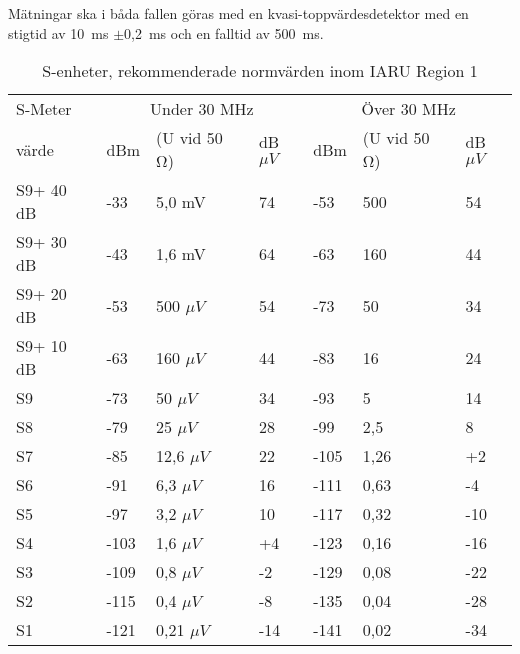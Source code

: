 Mätningar ska i båda fallen göras med en kvasi-toppvärdesdetektor
med en stigtid av 10~ms \(\pm\)0,2~ms och en falltid av 500~ms.

\begin{table}[h]
  \begin{tabular}{l|lll|lll}
    S-Meter  & \multicolumn{3}{c}{Under 30 MHz} & \multicolumn{3}{c}{Över 30 MHz} \\
    värde    & dBm & (U vid 50 Ω) & dB\(\mu V\) & dBm & (U vid 50 Ω) & dB\(\mu V\) \\
    \hline
    S9+ 40 dB & -33  & 5,0 mV  & 74  & -53  & 500  & 54  \\
    S9+ 30 dB & -43  & 1,6 mV  & 64  & -63  & 160  & 44  \\
    S9+ 20 dB & -53  & 500 \(\mu V\)  & 54  & -73  & 50   & 34  \\
    S9+ 10 dB & -63  & 160 \(\mu V\)  & 44  & -83  & 16   & 24  \\
    S9        & -73  & 50 \(\mu V\)   & 34  & -93  & 5    & 14  \\
    S8        & -79  & 25 \(\mu V\)   & 28  & -99  & 2,5  & 8   \\
    S7        & -85  & 12,6 \(\mu V\) & 22  & -105 & 1,26 & +2  \\
    S6        & -91  & 6,3 \(\mu V\)  & 16  & -111 & 0,63 & -4  \\
    S5        & -97  & 3,2 \(\mu V\)  & 10  & -117 & 0,32 & -10 \\
    S4        & -103 & 1,6 \(\mu V\)  & +4  & -123 & 0,16 & -16 \\
    S3        & -109 & 0,8 \(\mu V\)  & -2  & -129 & 0,08 & -22 \\
    S2        & -115 & 0,4 \(\mu V\)  & -8  & -135 & 0,04 & -28 \\
    S1        & -121 & 0,21 \(\mu V\) & -14 & -141 & 0,02 & -34 \\
  \end{tabular}
  \caption{S-enheter, rekommenderade normvärden inom IARU Region 1}
  \label{s-enhet tabell}
\end{table}
